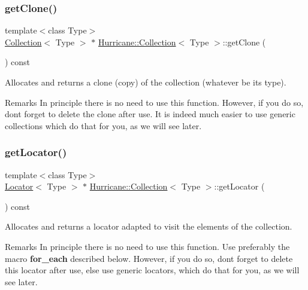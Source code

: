 \subsubsection{\texorpdfstring{get\+Clone()}{getClone()}}
{\footnotesize\ttfamily template$<$class Type$>$ \\
\mbox{\hyperlink{classHurricane_1_1Collection}{Collection}}$<$ Type $>$ $\ast$ \mbox{\hyperlink{classHurricane_1_1Collection}{Hurricane\+::\+Collection}}$<$ Type $>$\+::get\+Clone (\begin{DoxyParamCaption}{ }\end{DoxyParamCaption}) const\hspace{0.3cm}{\ttfamily [pure virtual]}}

Allocates and returns a clone (copy) of the collection (whatever be its type).

\begin{DoxyRemark}{Remarks}
In principle there is no need to use this function. However, if you do so, don\textquotesingle{}t forget to delete the clone after use. It is indeed much easier to use generic collections which do that for you, as we will see later. 
\end{DoxyRemark}
\mbox{\label{classHurricane_1_1Collection_a48fd1a0a2b6d2530a87e22ba65aa3152}} 
\subsubsection{\texorpdfstring{get\+Locator()}{getLocator()}}
{\footnotesize\ttfamily template$<$class Type$>$ \\
\mbox{\hyperlink{classHurricane_1_1Locator}{Locator}}$<$ Type $>$ $\ast$ \mbox{\hyperlink{classHurricane_1_1Collection}{Hurricane\+::\+Collection}}$<$ Type $>$\+::get\+Locator (\begin{DoxyParamCaption}{ }\end{DoxyParamCaption}) const\hspace{0.3cm}{\ttfamily [pure virtual]}}

Allocates and returns a locator adapted to visit the elements of the collection.

\begin{DoxyRemark}{Remarks}
In principle there is no need to use this function. Use preferably the macro {\bfseries for\+\_\+each} described below. However, if you do so, don\textquotesingle{}t forget to delete this locator after use, else use generic locators, which do that for you, as we will see later. 
\end{DoxyRemark}



